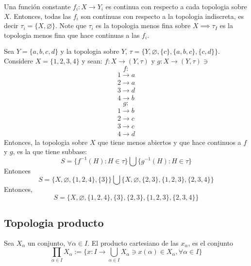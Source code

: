 \begin{ejemplo}
    Una función constante $f_i: X\to Y_i$ es continua con respecto a cada topologia sobre $X$. Entonces, todas las $f_i$ son continuas con respecto a la topologia indiscreta, es decir $\tau_i=\{X,\varnothing\}$. Note que $\tau_i$ es la topologia menos fina sobre $X\implies \tau_I$ es la topologia menos fina que hace continuas a las $f_i$. 
\end{ejemplo}

\begin{ejemplo}
    Sea $Y=\{a,b,c,d\}$ y la topologia sobre $Y$, $\tau=\{Y,\varnothing,\{c\},\{a,b,c\},\{c,d\}\}$. Considere $X=\{1,2,3,4\}$ y sean: $f:X\to (Y,\tau)$ y $g:X\to (Y,\tau)\ni $
    $$f:$$
    \begin{align*}
        1\to a\\
        2\to a\\
        3\to d\\
        4\to b 
    \end{align*}
    $$g:$$
    \begin{align*}
        1\to b\\
        2\to c\\
        3\to c\\
        4\to d
    \end{align*}
    Entonces, la topologia sobre $X$ que tiene menos abiertos y que hace continuos a $f$ y $g$, es la que tiene subbase: 
    $$S=\{f^{-1}(H):H\in \tau\}\bigcup \{g^{-1}(H):H\in\tau\}$$
    Entonces 
    $$S=\{X,\varnothing,\{1,2,4\},\{3\}\}\bigcup \{X,\varnothing,\{2,3\},\{1,2,3\},\{2,3,4\}\}$$
    Entonces,
    $$S=\{X,\varnothing,\{1,2,4\},\{3\}, \{2,3\},\{1,2,3\},\{2,3,4\}\}$$

\end{ejemplo}

\subsection*{Topologia producto}
Sea $X_\alpha$ un conjunto, $\forall \alpha \in I$. El producto cartesiano de las $x_\alpha$, es el conjunto 
$$\prod_{\alpha\in I} X_\alpha := \{x:I\to \bigcup_{\alpha\in I}X_\alpha \ni x(\alpha)\in X_\alpha, \forall \alpha \in I\}$$

